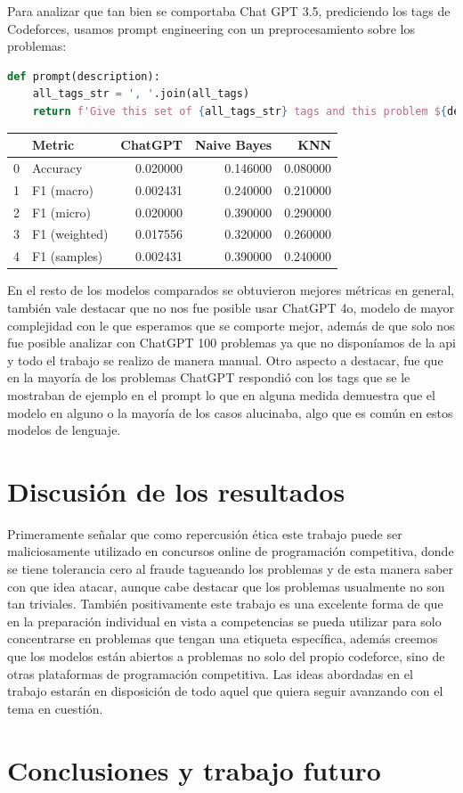\documentclass{article}
\begin{document}
Para analizar que tan bien se comportaba Chat GPT 3.5, prediciendo los tags de Codeforces, usamos prompt engineering
con un preprocesamiento sobre los problemas:

\begin{lstlisting}[language=Python, caption=Prompt para tagear los problemas]
def prompt(description):
    all_tags_str = ', '.join(all_tags)
    return f'Give this set of {all_tags_str} tags and this problem ${description}, give me the set of problem tags in the following format: greedy, implementation, dp'
\end{lstlisting}

\begin{tabular}{|l|l|r|r|r|}
    \toprule
    {} & Metric        & ChatGPT  & Naive Bayes & KNN      \\
    \midrule
    0  & Accuracy      & 0.020000 & 0.146000    & 0.080000 \\
    1  & F1 (macro)    & 0.002431 & 0.240000    & 0.210000 \\
    2  & F1 (micro)    & 0.020000 & 0.390000    & 0.290000 \\
    3  & F1 (weighted) & 0.017556 & 0.320000    & 0.260000 \\
    4  & F1 (samples)  & 0.002431 & 0.390000    & 0.240000 \\
    \bottomrule
\end{tabular}

En el resto de los modelos comparados se obtuvieron mejores métricas en general, también vale destacar que no nos fue posible
usar ChatGPT 4o, modelo de mayor complejidad con le que esperamos que se comporte mejor, además de que solo nos fue posible 
analizar con ChatGPT 100 problemas ya que no disponíamos de la api y todo el trabajo se realizo de manera manual. Otro aspecto
a destacar, fue que en la mayoría de los problemas ChatGPT respondió  con los tags que se le mostraban de ejemplo en el prompt
lo que en alguna medida demuestra que el modelo en alguno o la mayoría de los casos alucinaba, algo que es común en estos modelos 
de lenguaje.

\section{Discusión de los resultados}
Primeramente señalar que como repercusión ética este trabajo puede ser maliciosamente utilizado en concursos online de 
programación competitiva, donde se tiene tolerancia cero al fraude tagueando los problemas 
y de esta manera saber con que idea atacar, aunque cabe destacar que los problemas usualmente no son tan triviales. También positivamente este trabajo es una excelente forma de que en la preparación individual en vista a competencias se pueda utilizar para solo concentrarse en problemas que tengan una etiqueta específica, además creemos que los modelos están abiertos a problemas no solo del propio codeforce, sino de otras plataformas de programación competitiva. Las ideas abordadas en el trabajo
estarán en disposición de todo aquel que quiera seguir avanzando con el tema en cuestión.

\section{Conclusiones y trabajo futuro}
\end{document}
